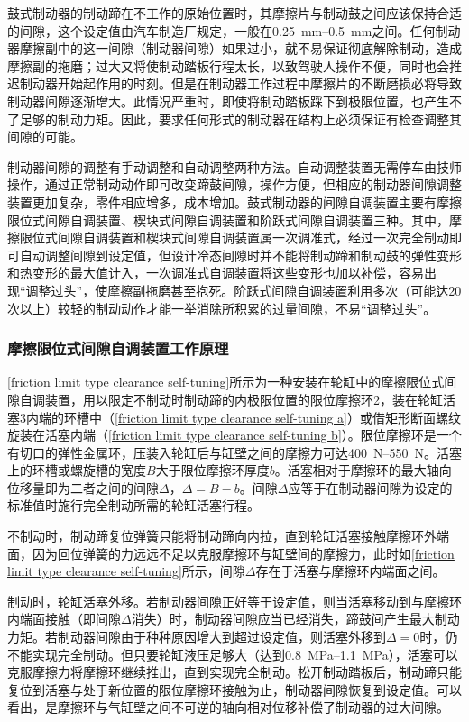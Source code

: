 \documentclass[UTF8]{ctexart}
\numberwithin{figure}{section}
\numberwithin{table}{section}
\begin{document}
鼓式制动器的制动蹄在不工作的原始位置时，其摩擦片与制动鼓之间应该保持合适的间隙，这个设定值由汽车制造厂规定，一般在\qtyrange[range-phrase = $\,\sim\,$, range-units = single]{0.25}{0.5}{\mm}之间。任何制动器摩擦副中的这一间隙（制动器间隙）如果过小，就不易保证彻底解除制动，造成摩擦副的拖磨；过大又将使制动踏板行程太长，以致驾驶人操作不便，同时也会推迟制动器开始起作用的时刻。但是在制动器工作过程中摩擦片的不断磨损必将导致制动器间隙逐渐增大。此情况严重时，即使将制动踏板踩下到极限位置，也产生不了足够的制动力矩。因此，要求任何形式的制动器在结构上必须保证有检查调整其间隙的可能。

制动器间隙的调整有手动调整和自动调整两种方法。自动调整装置无需停车由技师操作，通过正常制动动作即可改变蹄鼓间隙，操作方便，但相应的制动器间隙调整装置更加复杂，零件相应增多，成本增加。鼓式制动器的间隙自调装置主要有摩擦限位式间隙自调装置、楔块式间隙自调装置和阶跃式间隙自调装置三种。其中，摩擦限位式间隙自调装置和楔块式间隙自调装置属一次调准式，经过一次完全制动即可自动调整间隙到设定值，但设计冷态间隙时并不能将制动蹄和制动鼓的弹性变形和热变形的最大值计入，一次调准式自调装置将这些变形也加以补偿，容易出现“调整过头”，使摩擦副拖磨甚至抱死。阶跃式间隙自调装置利用多次（可能达20次以上）较轻的制动动作才能一举消除所积累的过量间隙，不易“调整过头”。

\subsubsection{摩擦限位式间隙自调装置工作原理}

\cref{friction limit type clearance self-tuning}所示为一种安装在轮缸中的摩擦限位式间隙自调装置，用以限定不制动时制动蹄的内极限位置的限位摩擦环2，装在轮缸活塞3内端的环槽中（\cref{friction limit type clearance self-tuning a}）或借矩形断面螺纹旋装在活塞内端（\cref{friction limit type clearance self-tuning b}）。限位摩擦环是一个有切口的弹性金属环，压装入轮缸后与缸壁之间的摩擦力可达\qtyrange[range-phrase = $\,\sim\,$, range-units = single]{400}{550}{\newton}。活塞上的环槽或螺旋槽的宽度$B$大于限位摩擦环厚度$b$。活塞相对于摩擦环的最大轴向位移量即为二者之间的间隙$\Delta$，$\Delta=B-b$。间隙$\Delta$应等于在制动器间隙为设定的标准值时施行完全制动所需的轮缸活塞行程。

不制动时，制动蹄复位弹簧只能将制动蹄向内拉，直到轮缸活塞接触摩擦环外端面，因为回位弹簧的力远远不足以克服摩擦环与缸壁间的摩擦力，此时如\cref{friction limit type clearance self-tuning}所示，间隙$\Delta$存在于活塞与摩擦环内端面之间。

制动时，轮缸活塞外移。若制动器间隙正好等于设定值，则当活塞移动到与摩擦环内端面接触（即间隙$\Delta$消失）时，制动器间隙应当已经消失，蹄鼓间产生最大制动力矩。若制动器间隙由于种种原因增大到超过设定值，则活塞外移到$\Delta=0$时，仍不能实现完全制动。但只要轮缸液压足够大（达到\qtyrange[range-phrase = $\,\sim\,$, range-units = single]{0.8}{1.1}{\mega\pascal}），活塞可以克服摩擦力将摩擦环继续推出，直到实现完全制动。松开制动踏板后，制动蹄只能复位到活塞与处于新位置的限位摩擦环接触为止，制动器间隙恢复到设定值。可以看出，是摩擦环与气缸壁之间不可逆的轴向相对位移补偿了制动器的过大间隙。
\end{document}
